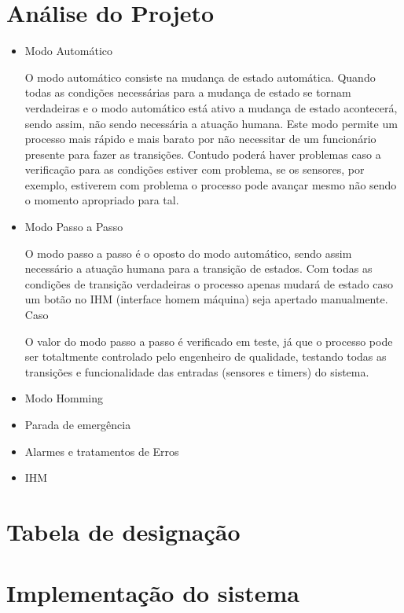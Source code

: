 \documentclass[12pt]{article}
\begin{document}
	\section {Análise do Projeto}
	\begin {itemize}
	\item Modo Automático
	\begin{par}
	
	O modo automático consiste na mudança de estado automática. Quando todas as condições necessárias para a mudança de estado se tornam verdadeiras e o modo automático está ativo a mudança de estado acontecerá, sendo assim, não sendo necessária a atuação humana. Este modo permite um processo mais rápido e mais barato por não necessitar de um funcionário presente para fazer as transições. Contudo poderá haver problemas caso a verificação para as condições estiver com problema, se os sensores, por exemplo, estiverem com problema o processo pode avançar mesmo não sendo o momento apropriado para tal.
	\end{par}
	\item Modo Passo a Passo
	
	O modo passo a passo é o oposto do modo automático, sendo assim necessário a atuação humana para a transição de estados. Com todas as condições de transição verdadeiras o processo apenas mudará de estado caso um botão no IHM (interface homem máquina) seja apertado manualmente. Caso 
	
	O valor do modo passo a passo é verificado em teste, já que o processo pode ser totaltmente controlado pelo engenheiro de qualidade, testando todas as transições e funcionalidade das entradas (sensores e timers) do sistema.
	\item Modo Homming
	
	\item Parada de emergência
	
	\item Alarmes e tratamentos de Erros
	
	\item IHM
\end{itemize}

\section {Tabela de designação}

\section {Implementação do sistema}
\end{document}
